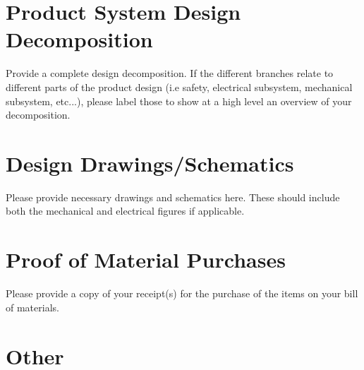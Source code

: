 \documentclass{ipfwpaper}
\begin{document}
\clearpage
\appendix
 \renewcommand{\thesection}{\Alph{section}.}
\setcounter{section}{0}

\section{Product System Design Decomposition}
Provide a complete design decomposition. If the different branches relate to different parts of the product design (i.e safety, electrical subsystem, mechanical subsystem, etc...), please label those to show at a high level an overview of your decomposition. 




\clearpage
\section{Design Drawings/Schematics}
Please provide necessary drawings and schematics here. These should include both the mechanical and electrical figures if applicable. 


\clearpage
\section{Proof of Material Purchases}
Please provide a copy of your receipt(s) for the purchase of the items on your bill of materials. 

\clearpage
\section{Other}
\end{document}
